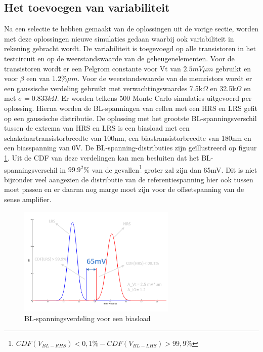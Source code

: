 \subsection{Het toevoegen van variabiliteit}\label{sec:varload}
Na een selectie te hebben gemaakt van de oplossingen uit de vorige sectie, worden met deze oplossingen nieuwe simulaties gedaan waarbij ook variabiliteit in rekening gebracht wordt. De variabiliteit is toegevoegd op alle transistoren in het testcircuit en op de weerstandswaarde van de geheugenelementen. Voor de transistoren wordt er een Pelgrom constante voor Vt van $2.5mV\mu m$ gebruikt en voor $\beta$ een van $1.2\% \mu m$\cite{ppt:variatie}. Voor de weerstandswaarde van de memristors wordt er een gaussische verdeling gebruikt met verwachtingswaardes 7.5k$\Omega$ en 32.5k$\Omega$ en met $\sigma = 0.833k\Omega$. Er worden telkens 500 Monte Carlo simulaties uitgevoerd per oplossing. Hierna worden de BL-spanningen van cellen met een HRS en LRS gefit op een gaussische distributie. De oplossing met het grootste BL-spanningsverschil tussen de extrema van HRS en LRS is een biasload met een schakelaartransistorbreedte van 100nm, een biastransistorbreedte van 180nm en een biasspanning van 0V. De BL-spanning-distributies zijn geïllustreerd op figuur \ref{fig:distbias}. Uit de CDF van deze verdelingen kan men besluiten dat het BL-spanningsverschil in $99.9^2\%$ van de gevallen\footnote{$CDF(V_{BL-RHS})<0,1\%-CDF(V_{BL-LHS})>99,9\%$} groter zal zijn dan 65mV. Dit is niet bijzonder veel aangezien de distributie van de referentiespanning hier ook tussen moet passen en er daarna nog marge moet zijn voor de offsetspanning van de sense amplifier. 

\begin{figure}[!ht]
  \centering
  \includegraphics[width=0.67\textwidth]{../fig/hfdst-last-var1.png}
  \caption[BL-spanningsverdeling voor een biasload]{BL-spanningsverdeling voor een biasload}
  \label{fig:distbias}
\end{figure}

